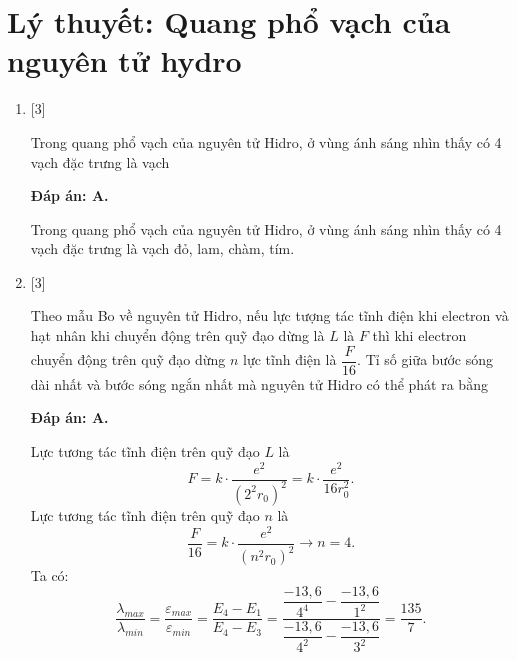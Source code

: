 \section{Lý thuyết: Quang phổ vạch của nguyên tử hydro}
\begin{enumerate}[label=\bfseries Câu \arabic*:]

		\item {} [3]
	
		\cauhoi
		{Trong quang phổ vạch của nguyên tử Hidro, ở vùng ánh sáng nhìn thấy có 4 vạch đặc trưng là vạch
		}
	
		\loigiai
		{		\textbf{Đáp án: A.}

Trong quang phổ vạch của nguyên tử Hidro, ở vùng ánh sáng nhìn thấy có 4 vạch đặc trưng là vạch đỏ, lam, chàm, tím.
		}

		\item {} [3]
	
		\cauhoi
		{Theo mẫu Bo về nguyên tử Hidro, nếu lực tượng tác tĩnh điện khi electron và hạt nhân khi chuyển động trên quỹ đạo dừng là $ L $ là $ F $ thì khi electron chuyển động trên quỹ đạo dừng $ n $ lực tĩnh điện là $ \dfrac{F}{16} $. Tỉ số giữa bước sóng dài nhất và bước sóng ngắn nhất mà nguyên tử Hidro có thể phát ra bằng
		}
	
		\loigiai
		{		\textbf{Đáp án: A.}

Lực tương tác tĩnh điện trên quỹ đạo $ L $ là
$$
	F = k \cdot \dfrac{e^{2}}{\left( 2^{2} r_{0} \right)^2} = k \cdot \dfrac{e^{2}}{16 r_{0}^{2}}.
$$
Lực tương tác tĩnh điện trên quỹ đạo $ n $ là
$$
	\dfrac{F}{16} = k \cdot \dfrac{e^{2}}{\left( n^{2} r_{0} \right)^2} \rightarrow n = \num{4}.
$$
Ta có:
$$
	\dfrac{\lambda_{max}}{\lambda_{min}} = \dfrac{\varepsilon_{max}}{\varepsilon_{min}} = \dfrac{E_{4} - E_{1}}{E_{4} - E_{3}} = \dfrac{\dfrac{-13,6}{4^{4}} - \dfrac{-13,6}{1^{2}}}{\dfrac{-13,6}{4^{2}} - \dfrac{-13,6}{3^{2}}} = \dfrac{135}{7}.
$$
		}
		

\end{enumerate}
